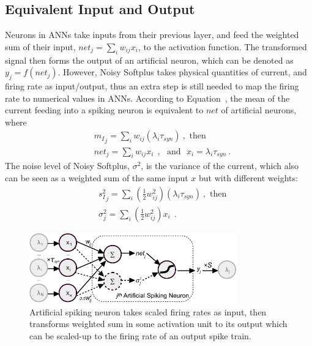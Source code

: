 \documentclass{article}
\begin{document}
\subsection{Equivalent Input and Output}

Neurons in ANNs take inputs from their previous layer, and feed the weighted sum of their input, $net_j = \sum_i w_{ij}x_i$, to the activation function.
The transformed signal then forms the output of an artificial neuron, which can be denoted as  $y_j=f(net_j)$.	
However, Noisy Softplus takes physical quantities of current, and firing rate as input/output, thus an extra step is still needed to map the firing rate to numerical values in ANNs.
According to Equation~\cite{Noisysoftplus}, the mean of the current feeding into a spiking neuron is equivalent to $net$ of artificial neurons, where
\begin{equation}
\begin{aligned}
& {m_I}_j = \sum_i w_{ij}(\lambda_{i}\tau_{syn})~, \textrm{  then}\\
& net_j= \sum_i w_{ij} x_i~~, \textrm{~~and~~}
x_i = \lambda_{i}\tau_{syn}~.
\end{aligned}
\label{equ:mi_input}
\end{equation}
The noise level of Noisy Softplus, $\sigma^2$, is the variance of the current, which also can be seen as a weighted sum of the same input $x$ but with different weights:
\begin{equation}
\begin{aligned}
& {s_I^2}_j=\sum_i(\frac{1}{2} w_{ij}^2) (\lambda_{i}\tau_{syn})~, \textrm{  then}\\
& \sigma^2_j= \sum_i (\frac{1}{2} w_{ij}^2) x_i~~.
\end{aligned}
\label{equ:si_input}
\end{equation}

\begin{figure}[bt!]
	\centering
	\includegraphics[width=0.8\textwidth]{pics_iconip/neuron_o.pdf}
	\caption{Artificial spiking neuron takes scaled firing rates as input, then transforms weighted sum in some activation unit to its output which can be scaled-up to the firing rate of an output spike train.}
	\label{Fig:sneuron}
\end{figure}
\end{document}
